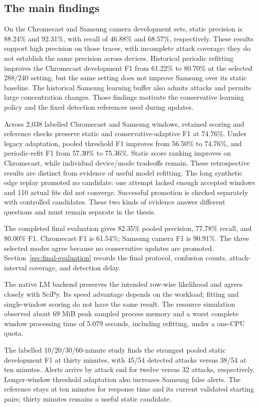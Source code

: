 \subsection{The main findings}

On the Chromecast and Samsung camera development sets, static precision is
88.24\% and 92.31\%, with recall of 46.88\% and 68.57\%, respectively.
These results support high precision on those traces, with incomplete attack
coverage; they do not establish the same precision across devices.
Historical periodic refitting improves the
Chromecast development F1 from 61.22\% to 80.70\% at the selected 288/240 setting,
but the same setting does not improve Samsung over its static baseline.
The historical Samsung learning buffer also admits attacks and permits large
concentration changes. Those findings motivate the conservative learning policy
and the fixed detection references used during updates.

Across 2,038 labelled Chromecast and Samsung windows, retained scoring and
reference checks preserve static and conservative-adaptive F1 at 74.76\%.
Under legacy adaptation, pooled threshold F1 improves from 56.50\% to 74.76\%,
and periodic-refit F1 from 57.30\% to 75.36\%. Static score ranking improves on
Chromecast, while individual device/mode tradeoffs remain. These retrospective results are
distinct from evidence of useful model refitting. The long synthetic edge replay
promoted no candidate: one attempt
lacked enough accepted windows and 110 actual fits did not converge. Successful
promotion is checked separately with controlled candidates. These two kinds of
evidence answer different questions and must remain separate in the thesis.

The completed final evaluation gives 82.35\% pooled precision, 77.78\% recall,
and 80.00\% F1. Chromecast F1 is 61.54\%; Samsung camera F1 is 90.91\%.
The three selected modes agree because no conservative updates are promoted.
Section~\ref{sec:final-evaluation} records the final protocol, confusion
counts, attack-interval coverage, and detection delay.

The native LM backend preserves the intended row-wise likelihood and agrees
closely with SciPy. Its speed advantage depends on the workload; fitting and
single-window scoring do not have the same result. The resource simulation
observed about 69 MiB peak sampled process memory and a worst complete window
processing time of 5.079 seconds, including refitting, under a one-CPU quota.

The labelled 10/20/30/60-minute study finds the strongest pooled static
development F1 at thirty minutes, with 45/54 detected attacks versus 38/54 at
ten minutes. Alerts arrive by attack end for twelve versus 32 attacks,
respectively. Longer-window threshold adaptation also increases Samsung false
alerts. The reference stays at ten minutes for response time and its current
validated starting pairs; thirty minutes remains a useful static candidate.

